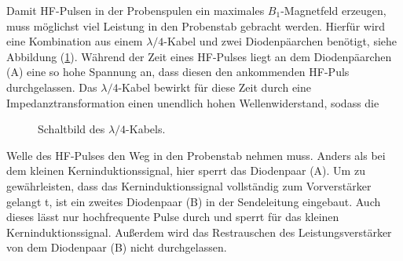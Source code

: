 Damit HF-Pulsen in der Probenspulen ein maximales $B_1$-Magnetfeld erzeugen, muss m\"{o}glichst viel Leistung in den Probenstab gebracht werden.
Hierf\"{u}r wird eine Kombination aus einem $\lambda / 4$-Kabel und zwei Diodenp\"{a}archen ben\"{o}tigt, siehe Abbildung (\ref{lambda4.}).
W\"{a}hrend der Zeit eines HF-Pulses liegt an dem Diodenp\"{a}archen (A) eine so hohe Spannung an, dass diesen den ankommenden HF-Puls durchgelassen.
Das $\lambda /4$-Kabel bewirkt f\"{u}r diese Zeit durch eine Impedanztransformation einen unendlich hohen Wellenwiderstand, sodass die 
\begin{figure}
	\centering
	\caption{Schaltbild des $\lambda / 4$-Kabels.}
	\label{lambda4.}
\end{figure}
Welle des HF-Pulses den Weg in den Probenstab nehmen muss.
Anders als bei dem kleinen Kerninduktionssignal, hier sperrt das Diodenpaar (A).
Um zu gew\"{a}hrleisten, dass das Kerninduk{\-}tions{\-}sig{\-}nal vollst\"{a}ndig zum Vorverst\"{a}rker gelangt t, ist ein zweites Diodenpaar (B) in der Sendeleitung eingebaut.
Auch dieses l\"{a}sst nur hochfrequente Pulse durch und sperrt f\"{u}r das kleinen Kerninduktionssignal.
Au{\ss}erdem wird das Restrauschen des Leistungsverst\"{a}rker von dem Diodenpaar (B) nicht durchgelassen.

